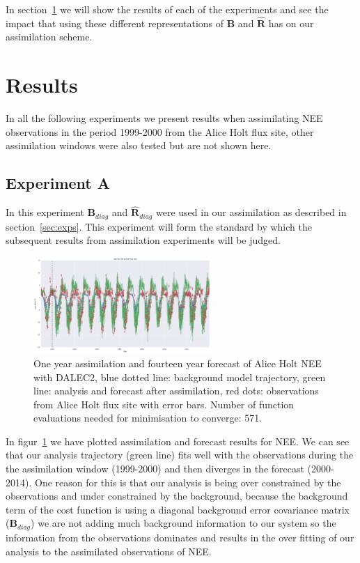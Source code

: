 \documentclass[11pt]{article}
\begin{document}
In section~\ref{sec:results} we will show the results of each of the experiments and see the impact that using these different representations of $\textbf{B}$ and $\hat{\mathbf{R}}$ has on our assimilation scheme.

\section{Results} \label{sec:results}

In all the following experiments we present results when assimilating NEE observations in the period 1999-2000 from the Alice Holt flux site, other assimilation windows were also tested but are not shown here.

\subsection{Experiment A} \label{sec:expa}
In this experiment $\textbf{B}_{diag}$ and $\hat{\textbf{R}}_{diag}$ were used in our assimilation as described in section~\ref{sec:exps}. This experiment will form the standard by which the subsequent results from assimilation experiments will be judged. 

\begin{figure}[ht]
    \centering
    \includegraphics[width=0.6\textwidth]{bdiagNone_4dvar.png}
    \caption{One year assimilation and fourteen year forecast of Alice Holt NEE with DALEC2, blue dotted line: background model trajectory, green line: analysis and forecast after assimilation, red dots: observations from Alice Holt flux site with error bars. Number of function evaluations needed for minimisation to converge: 571.}
    \label{fig:4dvardiagBR}
\end{figure}

In figur~\ref{fig:4dvardiagBR} we have plotted assimilation and forecast results for NEE. We can see that our analysis trajectory (green line) fits well with the observations during the the assimilation window (1999-2000) and then diverges in the forecast (2000-2014). One reason for this is that our analysis is being over constrained by the observations and under constrained by the background, because the background term of the cost function is using a diagonal background error covariance matrix ($\textbf{B}_{diag}$) we are not adding much background information to our system so the information from the observations dominates and results in the over fitting of our analysis to the assimilated observations of NEE.
\end{document}
